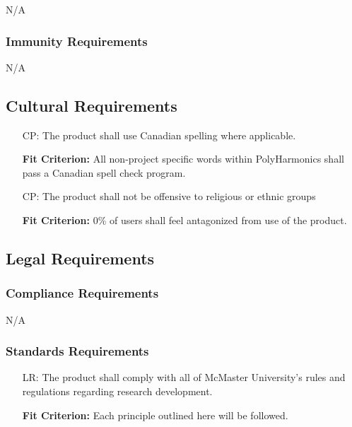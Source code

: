 \documentclass[12pt]{article}
\newcounter{culnum}
\newcounter{legalnum}
\newcommand{\progname}{PolyHarmonics}
\begin{document}
N/A

\subsubsection{Immunity Requirements}

N/A

\subsection{Cultural Requirements}

\noindent \begin{itemize}
\item[CP\refstepcounter{culnum}\theculnum\label{NF_cul1}:] The product shall use
  Canadian spelling where applicable.

\textbf{Fit Criterion:} All non-project specific words within \progname{}
 shall pass a Canadian spell check program.

\item[CP\refstepcounter{culnum}\theculnum\label{NF_cul2}:] The product shall not
  be offensive to religious or ethnic groups

  \textbf{Fit Criterion:} 0\% of users shall feel antagonized from use of the
  product.
\end{itemize}

\subsection{Legal Requirements}

\subsubsection{Compliance Requirements}

N/A

\subsubsection{Standards Requirements}

\noindent \begin{itemize}
\item[LR\refstepcounter{legalnum}\thelegalnum\label{NF_L1}:] The product shall
  comply with all of McMaster University's rules and regulations regarding
  research development.

  \textbf{Fit Criterion:} Each principle outlined here \cite{ResearchPrinciples} 
will be
  followed.
\end{itemize}
\end{document}
